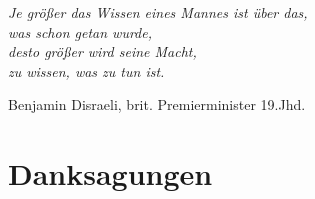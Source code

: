 \begin{center}
	\textit{
		Je größer das Wissen eines Mannes ist über das,\\
		was schon getan wurde,\\
		desto größer wird seine Macht, \\
		zu wissen, was zu tun ist. \\
	}
\end{center}
\begin{flushright}
	Benjamin Disraeli, brit. Premierminister 19.Jhd.
\end{flushright}


\cleardoublepage

\thispagestyle{plain}
\section*{Danksagungen}


\cleardoublepage

